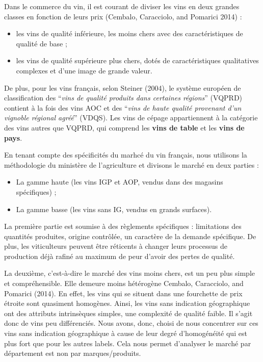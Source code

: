 \documentclass[11pt,]{article}
\providecommand{\tightlist}{%
  \setlength{\itemsep}{0pt}\setlength{\parskip}{0pt}}
\begin{document}
Dans le commerce du vin, il est courant de diviser les vins en deux
grandes classes en fonction de leurs prix (Cembalo, Caracciolo, and
Pomarici 2014) :

\begin{itemize}
\tightlist
\item
  les vins de qualité inférieure, les moins chers avec des
  caractéristiques de qualité de base ;
\item
  les vins de qualité supérieure plus chers, dotés de caractéristiques
  qualitatives complexes et d'une image de grande valeur.
\end{itemize}

De plus, pour les vins français, selon Steiner (2004), le système
européen de classification des ``\emph{vins de qualité produits dans
certaines régions}'' (VQPRD) contient à la fois des vins AOC et des
``\emph{vins de haute qualité provenant d'un vignoble régional agréé}''
(VDQS). Les vins de cépage appartiennent à la catégorie des vins autres
que VQPRD, qui comprend les \textbf{vins de table} et les
\textbf{vins de pays}.

En tenant compte des spécificités du marhcé du vin français, nous
utilisons la méthodologie du ministère de l'agriculture et divisons le
marché en deux parties :

\begin{itemize}
\tightlist
\item
  La gamme haute (les vins IGP et AOP, vendus dans des magasins
  spécifiques) ;
\item
  La gamme basse (les vins sans IG, vendus en grands surfaces).
\end{itemize}

La première partie est soumise à des règlements spécifiques :
limitations des quantités produites, origine contrôlée, un caractère de
la demande spécifique. De plus, les viticulteurs peuvent être réticents
à changer leurs processus de production déjà rafiné au maximum de peur
d'avoir des pertes de qualité.

La deuxième, c'est-à-dire le marché des vins moins chers, est un peu
plus simple et compréhensible. Elle demeure moins hétérogène Cembalo,
Caracciolo, and Pomarici (2014). En effet, les vins qui se situent dans
une fourchette de prix étroite sont quasiment homogènes. Ainsi, les vins
sans indication géographique ont des attributs intrinsèques simples, une
complexité de qualité faible. Il s'agit donc de vins peu différenciés.
Nous avons, donc, choisi de nous concentrer sur ces vins sans indication
géographique à cause de leur degré d'homogénéité qui est plus fort que
pour les autres labels. Cela nous permet d'analyser le marché par
département est non par marques/produits.
\end{document}

